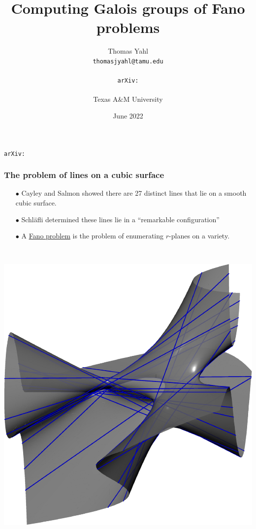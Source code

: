 \documentclass{beamer}
\title{Computing Galois groups of Fano problems}
\author{Thomas Yahl\\  \texttt{thomasjyahl@tamu.edu}\\ \vspace{-.1cm} \\ \texttt{arXiv:}\\ \vspace{-.1cm} \\ Texas A\&M University}
\date{June 2022}
\theoremstyle{definition}
\newcommand{\blue}[1]{{\color{black!15!blue}\underline{#1}}}
\begin{document}
\begin{frame}
\titlepage

\texttt{arXiv:}
\end{frame}



\begin{frame}
\frametitle{The problem of lines on a cubic surface}
\hspace{-.8cm}
\begin{minipage}{.55\textwidth}
\begin{enumerate}
\item[$\bullet$] Cayley and Salmon showed there are 27 distinct lines that lie on a smooth cubic surface.

\item[$\bullet$] Schl\"{a}fli determined these lines lie in a ``remarkable configuration'' 

\item[$\bullet$] A \blue{Fano problem} is the problem of enumerating $r$-planes on a variety.
\end{enumerate}
\end{minipage}
%
\begin{minipage}{.01\textwidth}
~
\end{minipage}
%
\begin{minipage}{.43\textwidth}
\begin{center}
\includegraphics[scale=.3]{figures/27lines.pdf}
\end{center}
\end{minipage}


\end{frame}
\end{document}
